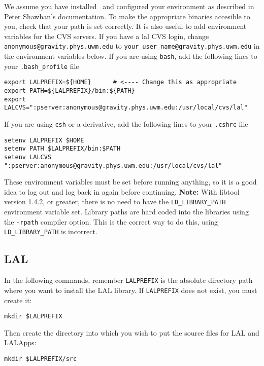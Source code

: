 We assume you have installed \ligotools\ and configured your
environment as described in Peter Shawhan's documentation.   
To make the appropriate binaries accesible to you,  check that your path is
set correctly. It is also useful to add environment variables for the CVS
servers. If you have a lal CVS login, change
\verb+anonymous@gravity.phys.uwm.edu+ to
\verb+your_user_name@gravity.phys.uwm.edu+ in the environment variables below.
If you are using \texttt{bash}, add
the following lines to your \texttt{.bash\_profile} file
\begin{verbatim}
export LALPREFIX=${HOME}      # <---- Change this as appropriate
export PATH=${LALPREFIX}/bin:${PATH}
export LALCVS=":pserver:anonymous@gravity.phys.uwm.edu:/usr/local/cvs/lal"
\end{verbatim}
If you are using \texttt{csh} or a derivative,  add the following lines to
your \texttt{.cshrc} file
\begin{verbatim}
setenv LALPREFIX $HOME
setenv PATH $LALPREFIX/bin:$PATH
setenv LALCVS ":pserver:anonymous@gravity.phys.uwm.edu:/usr/local/cvs/lal"
\end{verbatim}
These enviromnent variables must be set before running anything,
so it is a good idea to log out and log back in again before
continuing.   \textbf{Note:} With libtool version 1.4.2, or greater, there is
no need to have the \verb+LD_LIBRARY_PATH+ environment variable set. Library
paths are hard coded into the libraries using the \texttt{-rpath}
compiler option. This is the correct way to do this,  using
\verb+LD_LIBRARY_PATH+ is incorrect.  

\color{black}
\subsection{LAL}
\color{black}

In the following commands, remember \verb+LALPREFIX+ is the
absolute directory path where you want to install the LAL library.  If
\verb+LALPREFIX+ does not exist,  you must create it:
\begin{verbatim}
mkdir $LALPREFIX
\end{verbatim}
Then create the directory into which you wish to put the source files for LAL
and LALApps:
\begin{verbatim}
mkdir $LALPREFIX/src
\end{verbatim}

